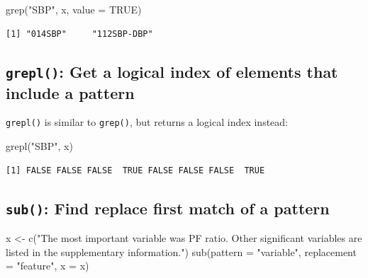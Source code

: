 \documentclass[
]{book}
\newenvironment{Shaded}{\begin{snugshade}}{\end{snugshade}}
\newcommand{\AttributeTok}[1]{\textcolor[rgb]{0.77,0.63,0.00}{#1}}
\newcommand{\ConstantTok}[1]{\textcolor[rgb]{0.00,0.00,0.00}{#1}}
\newcommand{\FunctionTok}[1]{\textcolor[rgb]{0.00,0.00,0.00}{#1}}
\newcommand{\NormalTok}[1]{#1}
\newcommand{\OtherTok}[1]{\textcolor[rgb]{0.56,0.35,0.01}{#1}}
\newcommand{\StringTok}[1]{\textcolor[rgb]{0.31,0.60,0.02}{#1}}
\begin{document}
\begin{Shaded}
\begin{Highlighting}[]
\FunctionTok{grep}\NormalTok{(}\StringTok{"SBP"}\NormalTok{, x, }\AttributeTok{value =} \ConstantTok{TRUE}\NormalTok{)}
\end{Highlighting}
\end{Shaded}

\begin{verbatim}
[1] "014SBP"     "112SBP-DBP"
\end{verbatim}

\hypertarget{grepl-get-a-logical-index-of-elements-that-include-a-pattern}{%
\subsection{\texorpdfstring{\texttt{grepl()}: Get a logical index of elements that include a pattern}{grepl(): Get a logical index of elements that include a pattern}}\label{grepl-get-a-logical-index-of-elements-that-include-a-pattern}}

\texttt{grepl()} is similar to \texttt{grep()}, but returns a logical index instead:

\begin{Shaded}
\begin{Highlighting}[]
\FunctionTok{grepl}\NormalTok{(}\StringTok{"SBP"}\NormalTok{, x)}
\end{Highlighting}
\end{Shaded}

\begin{verbatim}
[1] FALSE FALSE FALSE  TRUE FALSE FALSE FALSE  TRUE
\end{verbatim}

\hypertarget{sub-find-replace-first-match-of-a-pattern}{%
\subsection{\texorpdfstring{\texttt{sub()}: Find replace \textbf{first} match of a pattern}{sub(): Find replace first match of a pattern}}\label{sub-find-replace-first-match-of-a-pattern}}

\begin{Shaded}
\begin{Highlighting}[]
\NormalTok{x }\OtherTok{\textless{}{-}} \FunctionTok{c}\NormalTok{(}\StringTok{"The most important variable was PF ratio. Other significant variables are listed in the supplementary information."}\NormalTok{)}
\FunctionTok{sub}\NormalTok{(}\AttributeTok{pattern =} \StringTok{"variable"}\NormalTok{, }\AttributeTok{replacement =} \StringTok{"feature"}\NormalTok{, }\AttributeTok{x =}\NormalTok{ x)}
\end{Highlighting}
\end{Shaded}
\end{document}
